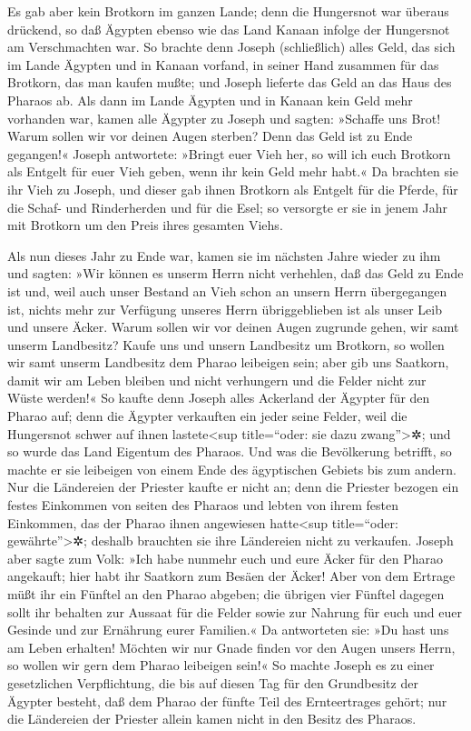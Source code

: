  Es gab aber kein Brotkorn im ganzen Lande; denn die
Hungersnot war überaus drückend, so daß Ägypten ebenso wie das Land
Kanaan infolge der Hungersnot am Verschmachten war.  So
brachte denn Joseph (schließlich) alles Geld, das sich im Lande Ägypten
und in Kanaan vorfand, in seiner Hand zusammen für das Brotkorn, das man
kaufen mußte; und Joseph lieferte das Geld an das Haus des Pharaos ab.
 Als dann im Lande Ägypten und in Kanaan kein Geld mehr
vorhanden war, kamen alle Ägypter zu Joseph und sagten: »Schaffe uns
Brot! Warum sollen wir vor deinen Augen sterben? Denn das Geld ist zu
Ende gegangen!«  Joseph antwortete: »Bringt euer Vieh
her, so will ich euch Brotkorn als Entgelt für euer Vieh geben, wenn ihr
kein Geld mehr habt.«  Da brachten sie ihr Vieh zu
Joseph, und dieser gab ihnen Brotkorn als Entgelt für die Pferde, für
die Schaf- und Rinderherden und für die Esel; so versorgte er sie in
jenem Jahr mit Brotkorn um den Preis ihres gesamten Viehs.

 Als nun dieses Jahr zu Ende war, kamen sie im nächsten
Jahre wieder zu ihm und sagten: »Wir können es unserm Herrn nicht
verhehlen, daß das Geld zu Ende ist und, weil auch unser Bestand an Vieh
schon an unsern Herrn übergegangen ist, nichts mehr zur Verfügung
unseres Herrn übriggeblieben ist als unser Leib und unsere Äcker.
 Warum sollen wir vor deinen Augen zugrunde gehen, wir
samt unserm Landbesitz? Kaufe uns und unsern Landbesitz um Brotkorn, so
wollen wir samt unserm Landbesitz dem Pharao leibeigen sein; aber gib
uns Saatkorn, damit wir am Leben bleiben und nicht verhungern und die
Felder nicht zur Wüste werden!«  So kaufte denn Joseph
alles Ackerland der Ägypter für den Pharao auf; denn die Ägypter
verkauften ein jeder seine Felder, weil die Hungersnot schwer auf ihnen
lastete\textless sup title=``oder: sie dazu zwang''\textgreater✲; und so
wurde das Land Eigentum des Pharaos.  Und was die
Bevölkerung betrifft, so machte er sie leibeigen von einem Ende des
ägyptischen Gebiets bis zum andern.  Nur die Ländereien
der Priester kaufte er nicht an; denn die Priester bezogen ein festes
Einkommen von seiten des Pharaos und lebten von ihrem festen Einkommen,
das der Pharao ihnen angewiesen hatte\textless sup title=``oder:
gewährte''\textgreater✲; deshalb brauchten sie ihre Ländereien nicht zu
verkaufen.  Joseph aber sagte zum Volk: »Ich habe nunmehr
euch und eure Äcker für den Pharao angekauft; hier habt ihr Saatkorn zum
Besäen der Äcker!  Aber von dem Ertrage müßt ihr ein
Fünftel an den Pharao abgeben; die übrigen vier Fünftel dagegen sollt
ihr behalten zur Aussaat für die Felder sowie zur Nahrung für euch und
euer Gesinde und zur Ernährung eurer Familien.«  Da
antworteten sie: »Du hast uns am Leben erhalten! Möchten wir nur Gnade
finden vor den Augen unsers Herrn, so wollen wir gern dem Pharao
leibeigen sein!«  So machte Joseph es zu einer
gesetzlichen Verpflichtung, die bis auf diesen Tag für den Grundbesitz
der Ägypter besteht, daß dem Pharao der fünfte Teil des Ernteertrages
gehört; nur die Ländereien der Priester allein kamen nicht in den Besitz
des Pharaos.

